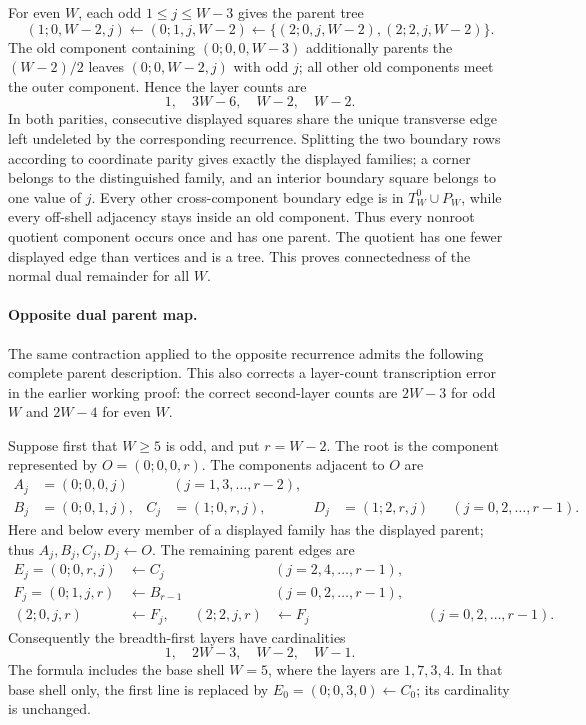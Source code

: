 \documentclass[11pt]{article}
\begin{document}
For even \(W\), each odd \(1\le j\le W-3\) gives the parent tree
\[
 (1;0,W-2,j)\longleftarrow(0;1,j,W-2)
 \longleftarrow
 \{(2;0,j,W-2),(2;2,j,W-2)\}.
\]
The old component containing \((0;0,0,W-3)\) additionally parents the
\((W-2)/2\) leaves \((0;0,W-2,j)\) with odd \(j\); all other old components
meet the outer component.  Hence the layer counts are
\[
 1,\quad3W-6,\quad W-2,\quad W-2.
\]
In both parities, consecutive displayed squares share the unique transverse
edge left undeleted by the corresponding recurrence.  Splitting the two
boundary rows according to coordinate parity gives exactly the displayed
families; a corner belongs to the distinguished family, and an interior
boundary square belongs to one value of \(j\).  Every other cross-component
boundary edge is in \(T_W^0\cup P_W\), while every off-shell adjacency stays
inside an old component.  Thus every nonroot quotient component occurs once
and has one parent.  The quotient has one fewer displayed edge than vertices
and is a tree.  This proves connectedness of the normal dual remainder for
all \(W\).

\paragraph{Opposite dual parent map.}
The same contraction applied to the opposite recurrence admits the following
complete parent description.  This also corrects a layer-count transcription
error in the earlier working proof: the correct second-layer counts are
\(2W-3\) for odd \(W\) and \(2W-4\) for even \(W\).

Suppose first that \(W\geq5\) is odd, and put
\(r=W-2\).  The root is the component represented by
\(O=(0;0,0,r)\).  The components adjacent to \(O\) are
\begin{align*}
 A_j&=(0;0,0,j) &&(j=1,3,\ldots,r-2),\\
 B_j&=(0;0,1,j),&
 C_j&=(1;0,r,j),&
 D_j&=(1;2,r,j) &&(j=0,2,\ldots,r-1).
\end{align*}
Here and below every member of a displayed family has the displayed parent;
thus \(A_j,B_j,C_j,D_j\leftarrow O\).  The remaining parent edges are
\begin{align*}
 E_j=(0;0,r,j)&\leftarrow C_j &&(j=2,4,\ldots,r-1),\\
 F_j=(0;1,j,r)&\leftarrow B_{r-1} &&(j=0,2,\ldots,r-1),\\
 (2;0,j,r)&\leftarrow F_j,&
 (2;2,j,r)&\leftarrow F_j &&(j=0,2,\ldots,r-1).
\end{align*}
Consequently the breadth-first layers have cardinalities
\[
 1,\quad2W-3,\quad W-2,\quad W-1.
\]
The formula includes the base shell \(W=5\), where the layers are
\(1,7,3,4\).  In that base shell only, the first line is replaced by
\(E_0=(0;0,3,0)\leftarrow C_0\); its cardinality is unchanged.
\end{document}
